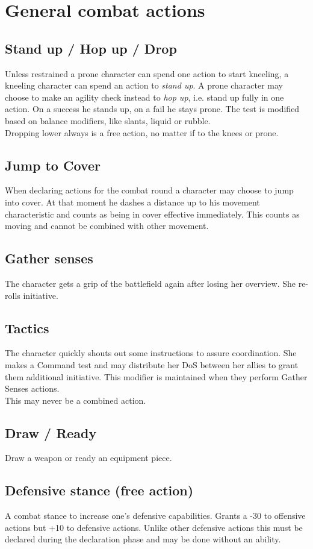 \newpage
\section{General combat actions}
\subsection*{Stand up / Hop up / Drop}
Unless restrained a prone character can spend one action to start kneeling, a kneeling character can spend an action to \emph{stand up}. A prone character may choose to make an agility check instead to \emph{hop up}, i.e. stand up fully in one action. On a success he stands up, on a fail he stays prone. The test is modified based on balance modifiers, like slants, liquid or rubble.\\
Dropping lower always is a free action, no matter if to the knees or prone.
\subsection*{Jump to Cover}
When declaring actions for the combat round a character may choose to jump into cover. At that moment he dashes a distance up to his movement characteristic and counts as being in cover effective immediately. This counts as moving and cannot be combined with other movement.
\subsection*{Gather senses}
The character gets a grip of the battlefield again after losing her overview. She re-rolls initiative.
\subsection*{Tactics}
The character quickly shouts out some instructions to assure coordination. She makes a Command test and may distribute her DoS between her allies to grant them additional initiative. This modifier is maintained when they perform Gather Senses actions.\\
This may never be a combined action.
\subsection*{Draw / Ready}
Draw a weapon or ready an equipment piece.
\subsection*{Defensive stance (free action)}
A combat stance to increase one’s defensive capabilities. Grants a -30 to offensive actions but +10 to defensive actions. Unlike other defensive actions this must be declared during the declaration phase and may be done without an ability.
